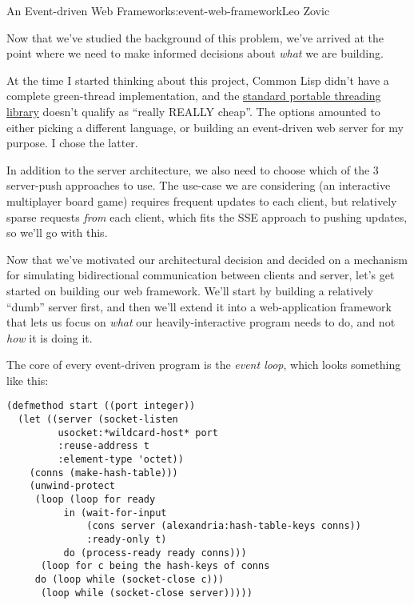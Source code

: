 \begin{aosachapter}{An Event-driven Web Framework}{s:event-web-framework}{Leo Zovic}
\label{architectural-decisions}

Now that we've studied the background of this problem, we've arrived at
the point where we need to make informed decisions about \emph{what} we
are building.

At the time I started thinking about this project, Common Lisp didn't
have a complete green-thread implementation, and the
\href{http://common-lisp.net/project/bordeaux-threads/}{standard
portable threading library} doesn't qualify as ``really REALLY cheap''.
The options amounted to either picking a different language, or building
an event-driven web server for my purpose. I chose the latter.

In addition to the server architecture, we also need to choose which of
the 3 server-push approaches to use. The use-case we are considering (an
interactive multiplayer board game) requires frequent updates to each
client, but relatively sparse requests \emph{from} each client, which
fits the SSE approach to pushing updates, so we'll go with this.

Now that we've motivated our architectural decision and decided on a
mechanism for simulating bidirectional communication between clients and
server, let's get started on building our web framework. We'll start by
building a relatively ``dumb'' server first, and then we'll extend it
into a web-application framework that lets us focus on \emph{what} our
heavily-interactive program needs to do, and not \emph{how} it is doing
it.

\label{building-an-event-driven-web-server}

\label{the-event-loop}

The core of every event-driven program is the \emph{event loop}, which
looks something like this:

\begin{verbatim}
(defmethod start ((port integer))
  (let ((server (socket-listen
         usocket:*wildcard-host* port
         :reuse-address t
         :element-type 'octet))
    (conns (make-hash-table)))
    (unwind-protect
     (loop (loop for ready
          in (wait-for-input
              (cons server (alexandria:hash-table-keys conns))
              :ready-only t)
          do (process-ready ready conns)))
      (loop for c being the hash-keys of conns
     do (loop while (socket-close c)))
      (loop while (socket-close server)))))
\end{verbatim}


\end{aosachapter}
